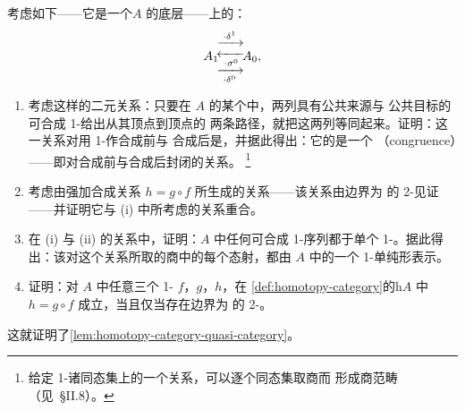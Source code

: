 \begin{exercise}\label{ex:homotopy-category-free-category}
考虑如下\trReflexiveDirectedGraph——它是一个\trQuasiCategory $A$ 的底层——上的\trFreeCategory{}：
\[
A_1\!
\begin{array}{@{}c@{}}
\xrightarrow{\;\cdot\delta^1\;}\\[-3pt]
\xleftarrow[\;\cdot\sigma^0\;]{}\\[-3pt]
\xrightarrow[\;\cdot\delta^0\;]{}
\end{array}
\!A_0,
\]
\begin{enumerate}[label=(\roman*)]
\item 考虑这样的二元关系：只要在 $A$ 的某个\trSimplex{}中，两列具有公共来源与
公共目标的可合成 1-\trSimplex{}给出从其\trInitial{}顶点到\trTerminal{}顶点的
两条路径，就把这两列等同起来。证明：这一关系对用 1-\trSimplex{}作合成前与
合成后是\trStable{}，并据此得出：它的\trTransitiveClosure{}是一个\textbf{\trCongruence}
（congruence）——即对合成前与合成后封闭的\trEquivalence{}关系。
\footnote{给定 1-\trCategory{}诸同态集上的一个\trCongruence{}关系，可以逐个同态集取商而
形成商范畴（见\cite{bib81}~\S II.8）。}
\item 考虑由强加合成关系 $h=g\circ f$ 所生成的\trCongruence{}关系——该关系由边界为
的 2-\trSimplex{}见证——并证明它与 (i) 中所考虑的关系重合。
\item 在 (i) 与 (ii) 的\trCongruence{}关系中，证明：$A$ 中任何可合成 1-\trSimplex{}序列都\trEquivalence{}于单个
1-\trSimplex{}。据此得出：该\trFreeCategory{}对这个\trCongruence{}关系所取的商中的每个态射，都由
$A$ 中的一个 1-单纯形表示。
\item 证明：对 $A$ 中任意三个 1-\trSimplex{} $f$，$g$，$h$，在
\cref{def:homotopy-category}的\trHomotopyCategory $\mathrm{h}A$ 中 $h=g\circ f$
成立，当且仅当存在边界为
的 2-\trSimplex{}。
\end{enumerate}
这就证明了\cref{lem:homotopy-category-quasi-category}。
\end{exercise}

